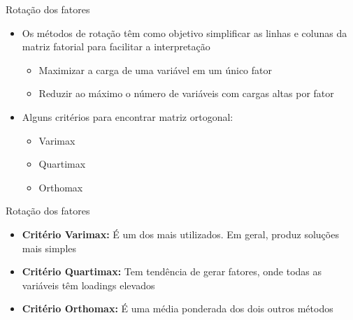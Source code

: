 \documentclass[
  ignorenonframetext,
  aspectratio=169,
]{beamer}
\providecommand{\tightlist}{%
  \setlength{\itemsep}{0pt}\setlength{\parskip}{0pt}}
\begin{document}
\begin{frame}{Rotação dos fatores}
\label{rotauxe7uxe3o-dos-fatores-5}
\begin{itemize}
\tightlist
\item
  Os métodos de rotação têm como objetivo simplificar as linhas e
  colunas da matriz fatorial para facilitar a interpretação

  \begin{itemize}
  \tightlist
  \item
    Maximizar a carga de uma variável em um único fator
  \item
    Reduzir ao máximo o número de variáveis com cargas altas por fator
  \end{itemize}
\end{itemize}

\pause

\begin{itemize}
\tightlist
\item
  Alguns critérios para encontrar matriz ortogonal:

  \begin{itemize}
  \tightlist
  \item
    Varimax
  \item
    Quartimax
  \item
    Orthomax
  \end{itemize}
\end{itemize}
\end{frame}

\begin{frame}{Rotação dos fatores}
\label{rotauxe7uxe3o-dos-fatores-6}
\begin{itemize}
\tightlist
\item
  \textbf{Critério Varimax:} É um dos mais utilizados. Em geral, produz
  soluções mais simples
\end{itemize}

\bigskip

\pause

\begin{itemize}
\tightlist
\item
  \textbf{Critério Quartimax:} Tem tendência de gerar fatores, onde
  todas as variáveis têm loadings elevados
\end{itemize}

\bigskip

\pause

\begin{itemize}
\tightlist
\item
  \textbf{Critério Orthomax:} É uma média ponderada dos dois outros
  métodos
\end{itemize}
\end{frame}
\end{document}
